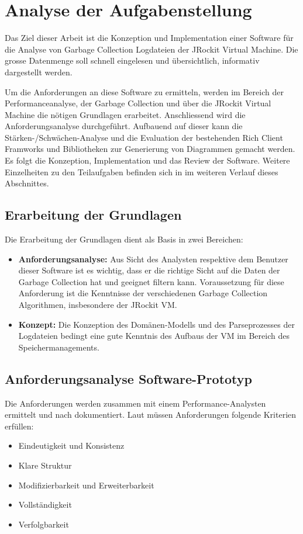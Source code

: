 \chapter{Analyse der Aufgabenstellung}\label{analyse_aufgabenstellung}
Das Ziel dieser Arbeit ist die Konzeption und Implementation einer Software für die Analyse von Garbage Collection Logdateien der JRockit Virtual Machine. Die grosse Datenmenge soll schnell eingelesen und übersichtlich, informativ dargestellt werden. 

Um die Anforderungen an diese Software zu ermitteln, werden im Bereich der Performanceanalyse, der Garbage Collection und über die JRockit Virtual Machine die nötigen Grundlagen erarbeitet. Anschliessend wird die Anforderungsanalyse durchgeführt. Aufbauend auf dieser kann die Stärken-/Schwächen-Analyse und die Evaluation der bestehenden Rich Client Framworks und Bibliotheken zur Generierung von Diagrammen gemacht werden. Es folgt die Konzeption, Implementation und das Review der Software. Weitere Einzelheiten zu den Teilaufgaben befinden sich in im weiteren Verlauf dieses Abschnittes.

\section{Erarbeitung der Grundlagen}
Die Erarbeitung der Grundlagen dient als Basis in zwei Bereichen:
\begin{itemize}
	\item \textbf{Anforderungsanalyse:} Aus Sicht des Analysten respektive dem Benutzer dieser Software ist es wichtig, dass er die richtige Sicht auf die Daten der Garbage Collection hat und geeignet filtern kann. Voraussetzung für diese Anforderung ist die Kenntnisse der verschiedenen Garbage Collection Algorithmen, insbesondere der JRockit VM. 
	\item \textbf{Konzept: } Die Konzeption des Domänen-Modells und des Parseprozesses der Logdateien bedingt eine gute Kenntnis des Aufbaus der VM im Bereich des Speichermanagements.
\end{itemize}

\section{Anforderungsanalyse Software-Prototyp}
Die Anforderungen werden zusammen mit einem Performance-Analysten ermittelt und nach \cite[4.3.2 Angepasste Standardinhalte]{pohl2010basiswissen} dokumentiert. Laut \cite[4.5 Qualitätskriterien für das Anforderungsdokument]{pohl2010basiswissen} müssen Anforderungen folgende Kriterien erfüllen:
\begin{itemize}
	\item Eindeutigkeit und Konsistenz
	\item Klare Struktur
	\item Modifizierbarkeit und Erweiterbarkeit
	\item Vollständigkeit
	\item Verfolgbarkeit
\end{itemize}

